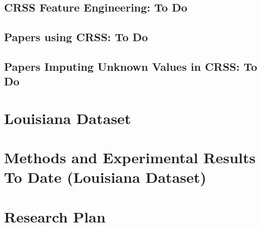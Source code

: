 \documentclass[11pt, twopage, openright]{book}
\begin{document}
\begin{spacing}{1.2}
\section{CRSS Feature Engineering:  To Do}
%
\section{Papers using CRSS:  To Do}
%
\section{Papers Imputing Unknown Values in CRSS:  To Do}
%

\newpage
\chapter{Louisiana Dataset}
\localtableofcontents\newpage



\newpage
\chapter{Methods and Experimental Results To Date (Louisiana Dataset)}
\localtableofcontents\newpage






\newpage
\chapter{Research Plan}
\label{sec:Research_Plan}
\localtableofcontents\newpage





\newpage
{}
{}
\printbibliography

\end{spacing}
\end{document}
